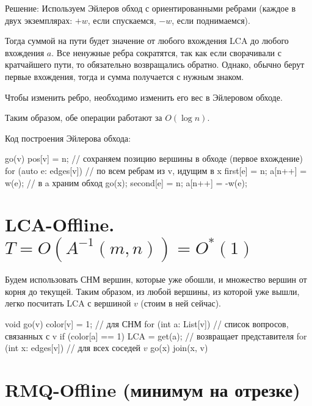 Решение:
Используем Эйлеров обход с ориентированными ребрами (каждое в двух экземплярах: $+w$, если спускаемся, $-w$, если поднимаемся).

Тогда суммой на пути будет значение от любого вхождения LCA до любого вхождения $a$.
Все ненужные ребра сократятся, так как если сворачивали с кратчайшего пути, то обязательно возвращались обратно.
Однако, обычно берут первые вхождения, тогда и сумма получается с нужным знаком.

Чтобы изменить ребро, необходимо изменить его вес в Эйлеровом обходе.

Таким образом, обе операции работают за $O(\log n)$.

Код построения Эйлерова обхода:

\begin{cppcode}
go(v) {
	pos[v] = n; // сохраняем позицию вершины в обходе (первое вхождение)
	for (auto e: edges[v]) { // по всем ребрам из v, идущим в x
		first[e] = n;
		a[n++] = w(e); // в a храним обход
		go(x);
		second[e] = n;
		a[n++] = -w(e);
	}
}
\end{cppcode}

\section{LCA-Offline. \texorpdfstring{$T = O\left(A^{-1}(m, n)\right) = O^*\left(1\right)$}{T = O(A\^{}-1(m, n)) = O*(1)}}

Будем использовать СНМ вершин, которые уже обошли, и множество вершин от корня до текущей.
Таким образом, из любой вершины, из которой уже вышли, легко посчитать LCA с вершиной $v$ (стоим в ней сейчас).


\begin{cppcode}
void go(v) {
	color[v] = 1; // для СНМ
	for (int a: List[v]) // список вопросов, связанных с v
		if (color[a] == 1)
			LCA = get(a); // возвращает представителя
	for (int x: edges[v]) { // для всех соседей $v$
		go(x)
		join(x, v)
	}
}
\end{cppcode}

\section{RMQ-Offline (минимум на отрезке)}


